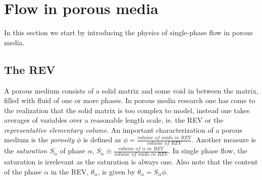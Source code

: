 \documentclass[../Main/main.tex]{subfiles}
\begin{document}
\graphicspath{{../Flow in porous media/figs/}}
\chapter{Flow in porous media}




In this section we start by introducing the physics of single-phase flow in porous media.




\section*{The REV}\label{REV}
A porous medium consists of a solid matrix and some void in between the matrix, filled with fluid of one or more phases. In porous media research one has come to the realization that the solid matrix is too complex to model, instead one takes averages of variables over a reasonable length scale, ie. the REV or the \emph{representative elementary volume}.
An important characterization of a porous medium is the \emph{porosity} $\phi$ is defined as $\phi = \frac{\textit{volume of voids in REV}}{\textit{volume of REV}}$. Another measure is the \emph{saturation} $S_{\alpha}$ of phase $\alpha$,  $S_{\alpha} \equiv \frac{\textit{volume of }\alpha \textit{ in REV}}{\textit{volume of voids in REV}}$. In single phase flow, the saturation is irrelevant as the saturation is always one. Also note that the content of the phase $\alpha$ in the REV, $\theta_{\alpha}$, is given by $\theta_{\alpha} = S_{\alpha} \phi$.
\end{document}
